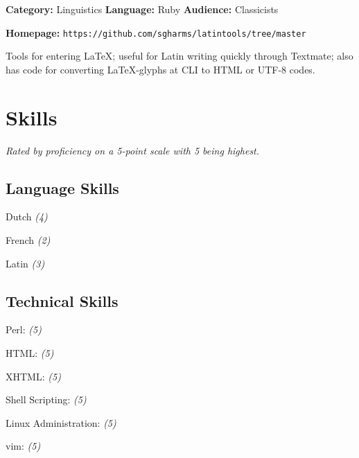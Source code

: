 \documentclass[]{article}
\begin{document}
{\bf Category:} Linguistics  {\bf Language:} Ruby {\bf Audience:} Classicists

{\bf Homepage:} {\tt https://github.com/sgharms/latintools/tree/master}
\vspace{0.05in}

Tools for entering \LaTeX; useful for Latin writing quickly through Textmate; also has code for converting \LaTeX-glyphs at CLI to HTML or UTF-8 codes.








\section*{Skills}



\emph{Rated by proficiency on a 5-point scale with 5 being highest.}
\subsection*{Language Skills}
Dutch \emph{(4)}
  \label{dutch4}

       

French \emph{(2)}
  \label{french2}

       

Latin \emph{(3)}
  \label{latin3}

       
	
\subsection*{Technical Skills}	
 Perl: \emph{(5)}
  \label{perl5}

       

 HTML: \emph{(5)}
  \label{html5}

       

 XHTML: \emph{(5)}
  \label{xhtml5}

       

 Shell Scripting: \emph{(5)}
  \label{shellscripting5}

       

 Linux Administration: \emph{(5)}
  \label{linuxadministration5}

       

 vim: \emph{(5)}
  \label{vim5}

       
\end{document}
